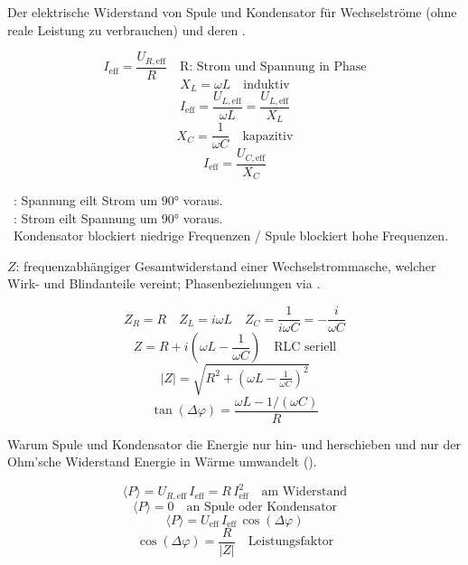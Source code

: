 \ZSFmanualColumnBreak
{}
\begin{runintext}
Der elektrische Widerstand von Spule und Kondensator für Wechselströme (ohne reale Leistung zu verbrauchen) und deren .
\end{runintext}
\begin{formulabox}
\[ I_{\mathrm{eff}} = \frac{U_{R,\mathrm{eff}}}{R} \quad \text{R: Strom und Spannung in Phase} \]
\formulasep
\[ X_L = \omega L \quad \text{induktiv} \]
\[ I_{\mathrm{eff}} = \frac{U_{L,\mathrm{eff}}}{\omega L} = \frac{U_{L,\mathrm{eff}}}{X_L} \]
\formulasep
\[ X_C = \frac{1}{\omega C} \quad \text{kapazitiv} \]
\[ I_{\mathrm{eff}} = \frac{U_{C,\mathrm{eff}}}{X_C} \]
\end{formulabox}
\begin{runintext}
\textbullet~: Spannung eilt Strom um 90° voraus.\\
\textbullet~: Strom eilt Spannung um 90° voraus.\\
\textbullet~Kondensator blockiert niedrige Frequenzen / Spule blockiert hohe Frequenzen.
\end{runintext}

\begin{runintext}
 $Z$: frequenzabhängiger Gesamtwiderstand einer Wechselstrommasche, welcher Wirk- und Blindanteile vereint; Phasenbeziehungen via .
\end{runintext}
\begin{formulabox}
\[ Z_R = R \quad Z_L = i\omega L \quad Z_C = \frac{1}{i\omega C} = -\frac{i}{\omega C} \]
\formulasep
\[ Z = R + i\!\left(\omega L - \frac{1}{\omega C}\right) \quad \text{RLC seriell} \]
\[ |Z| = \sqrt{R^2 + \left(\omega L - \tfrac{1}{\omega C}\right)^2} \]
\[ \tan(\Delta\varphi) = \frac{\omega L - 1/(\omega C)}{R} \]
\end{formulabox}

\begin{runintext}
Warum Spule und Kondensator die Energie nur hin- und herschieben und nur der Ohm'sche Widerstand Energie in Wärme umwandelt ().
\end{runintext}
\begin{formulabox}
\[ \langle P \rangle = U_{R,\mathrm{eff}}\,I_{\mathrm{eff}} = R\,I_{\mathrm{eff}}^2 \quad \text{am Widerstand} \]
\formulasep
\[ \langle P \rangle = 0 \quad \text{an Spule oder Kondensator} \]
\formulasep
\[ \langle P \rangle = U_{\mathrm{eff}}\,I_{\mathrm{eff}}\,\cos(\Delta\varphi) \]
\[ \cos(\Delta\varphi) = \frac{R}{|Z|} \quad \text{Leistungsfaktor} \]
\end{formulabox}

